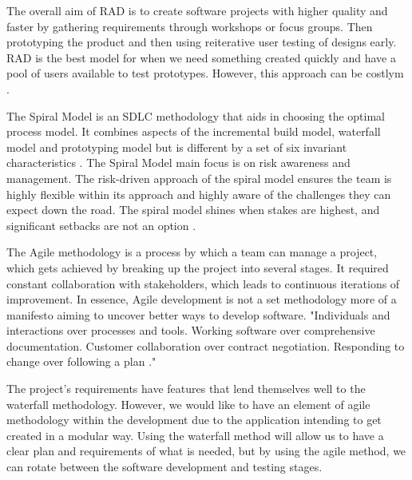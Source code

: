 The overall aim of RAD is to create software projects with higher quality and faster by gathering requirements through workshops or focus groups. Then prototyping the product and then using reiterative user testing of designs early. RAD is the best model for when we need something created quickly and have a pool of users available to test prototypes. However, this approach can be costlym \cite{cscm01slides}. 

The Spiral Model is an SDLC methodology that aids in choosing the optimal process model. It combines aspects of the incremental build model, waterfall model and prototyping model but is different by a set of six invariant characteristics \cite{spiralmodel}. The Spiral Model main focus is on risk awareness and management. The risk-driven approach of the spiral model ensures the team is highly flexible within its approach and highly aware of the challenges they can expect down the road. The spiral model shines when stakes are highest, and significant setbacks are not an option \cite{spiralmodel}.


The Agile methodology is a process by which a team can manage a project, which gets achieved by breaking up the project into several stages. It required constant collaboration with stakeholders, which leads to continuous iterations of improvement. In essence, Agile development is not a set methodology more of a manifesto aiming to uncover better ways to develop software. "Individuals and interactions over processes and tools. Working software over comprehensive documentation. Customer collaboration over contract negotiation. Responding to change over following a plan \cite{agilemanifesto}."

The project's requirements have features that lend themselves well to the waterfall methodology. However, we would like to have an element of agile methodology within the development due to the application intending to get created in a modular way. Using the waterfall method will allow us to have a clear plan and requirements of what is needed, but by using the agile method, we can rotate between the software development and testing stages.


